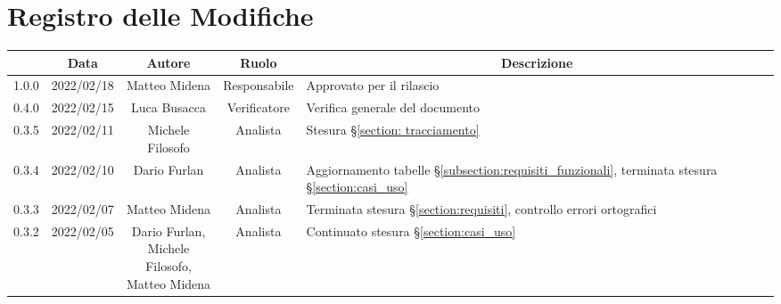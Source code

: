 \thispagestyle{empty}
\section*{Registro delle Modifiche}

\begin{center}
	\renewcommand{\arraystretch}{1.8}
	\begin{longtable}[c]{c | c | c | c | p{5cm}}
		\rowcolor[HTML]{125E28}
		\multicolumn{1}{c}{\color[HTML]{FFFFFF} \textbf{Versione}} &
		\multicolumn{1}{c}{\color[HTML]{FFFFFF} \textbf{Data}}     &
		\multicolumn{1}{c}{\color[HTML]{FFFFFF} \textbf{Autore}}   &
		\multicolumn{1}{c}{\color[HTML]{FFFFFF} \textbf{Ruolo}}    &
		\multicolumn{1}{c}{\color[HTML]{FFFFFF} \textbf{Descrizione}}                                                                                                                                                                \\
		\endhead
		1.0.0                                                      & 2022/02/18 & Matteo Midena             & Responsabile & Approvato per il rilascio                                                                               \\
		0.4.0                                                      & 2022/02/15 & Luca Busacca              & Verificatore & Verifica generale del documento    																	 \\
		0.3.5                                                      & 2022/02/11 & Michele Filosofo          & Analista     & Stesura §\ref{section: tracciamento}\\
		0.3.4                                                      & 2022/02/10 & Dario Furlan              & Analista     & Aggiornamento tabelle §\ref{subsection:requisiti_funzionali}, terminata stesura §\ref{section:casi_uso} \\
		0.3.3                                                      & 2022/02/07 & Matteo Midena             & Analista     & Terminata stesura §\ref{section:requisiti}, controllo errori ortografici                                \\
		0.3.2                                                      & 2022/02/05 & \shortstack{Dario Furlan,                                                                                                                          \\ Michele Filosofo,\\ Matteo Midena} & Analista & Continuato stesura §\ref{section:casi_uso} \\

\end{longtable}
\end{center}
